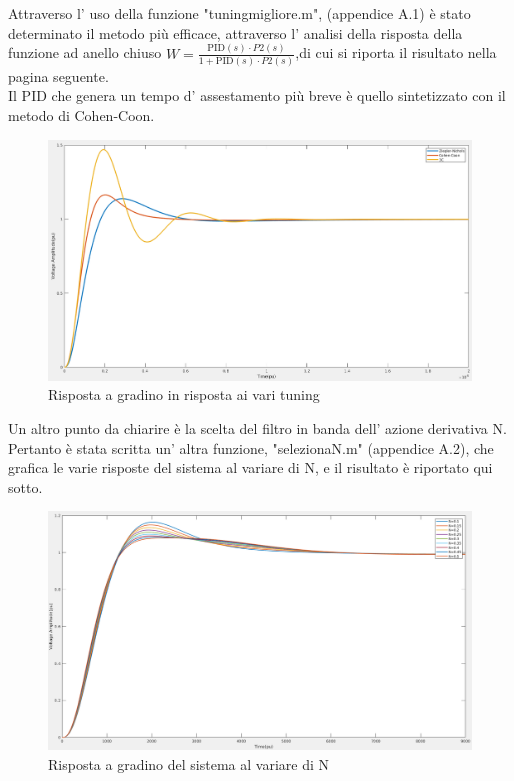 \documentclass[Lau,noexaminfo]{sapthesis}
\begin{document}
	Attraverso l' uso della funzione "tuning\textunderscore migliore.m", (appendice A.1) è stato determinato il metodo più efficace, attraverso l' analisi della risposta della funzione ad anello chiuso $W=\frac{\text{PID}(s)\cdot P2(s)}{1+\text{PID}(s)\cdot P2(s)}$,di cui si riporta il risultato nella pagina seguente.\\
	Il PID che genera un tempo d' assestamento più breve è
	quello sintetizzato con il metodo di Cohen-Coon.
	\begin{figure}
		\centering
			\includegraphics[scale=0.26]{step_response_metodi_P2}
			\caption{Risposta a gradino in risposta ai vari tuning}
	\end{figure}
	Un altro punto da chiarire è la scelta del filtro in banda dell' azione derivativa N. Pertanto è stata scritta un' altra funzione, "seleziona\textunderscore N.m" (appendice A.2), che grafica le varie risposte del sistema al variare di N, e il risultato è riportato qui sotto.
	\begin{figure}
		\centering
			\includegraphics[scale=0.26]{vari_N}
			\caption{Risposta a gradino del sistema al variare di N}
	\end{figure}
\end{document}

